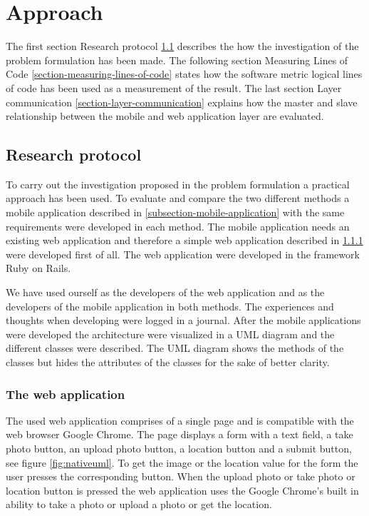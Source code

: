 \chapter{Approach}
The first section Research protocol \ref{section-research-protocol} describes the how the investigation of the problem formulation has been made. The following section Measuring Lines of Code \ref{section-measuring-lines-of-code} states how the software metric logical lines of code has been used as a measurement of the result. The last section Layer communication \ref{section-layer-communication} explains how the master and slave relationship between the mobile and web application layer are evaluated. 


\section{Research protocol} \label{section-research-protocol}
To carry out the investigation proposed in the problem formulation a practical approach has been used. To evaluate and compare the two different methods a mobile application described in \ref{subsection-mobile-application} with the same requirements were developed in each method. The mobile application needs an existing web application and therefore a simple web application described in \ref{subsection-web-application} were developed first of all. The web application were developed in the framework Ruby on Rails. 

We have used ourself as the developers of the web application and as the developers of the mobile application in both methods. The experiences and thoughts when developing were logged in a journal. After the mobile applications were developed the architecture were visualized in a UML diagram and the different classes were described. The UML diagram shows the methods of the classes but hides the attributes of the classes for the sake of better clarity. 

\subsection{The web application} \label{subsection-web-application}
The used web application comprises of a single page and is compatible with the web browser Google Chrome. The page displays a form with a text field, a take photo button, an upload photo button, a location button and a submit button, see figure \ref{fig:nativeuml}. To get the image or the location value for the form the user presses the corresponding button. When the upload photo or take photo or location button is pressed the web application uses the Google Chrome’s built in ability to take a photo or upload a photo or get the location.

